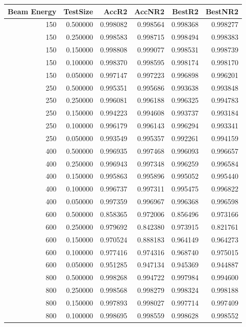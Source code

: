 \documentclass{article}
\begin{document}
	
\begin{tabular}{|r|r|r|r|r|r|}
\toprule
Beam Energy & TestSize & AccR2 & AccNR2 & BestR2 & BestNR2 \\
\midrule
150 & 0.500000 & 0.998082 & 0.998564 & 0.998368 & 0.998277 \\
150 & 0.250000 & 0.998583 & 0.998715 & 0.998494 & 0.998383 \\
150 & 0.150000 & 0.998808 & 0.999077 & 0.998531 & 0.998739 \\
150 & 0.100000 & 0.998370 & 0.998595 & 0.998174 & 0.998170 \\
150 & 0.050000 & 0.997147 & 0.997223 & 0.996898 & 0.996201 \\
250 & 0.500000 & 0.995351 & 0.995686 & 0.993638 & 0.993848 \\
250 & 0.250000 & 0.996081 & 0.996188 & 0.996325 & 0.994783 \\
250 & 0.150000 & 0.994223 & 0.994608 & 0.993737 & 0.993184 \\
250 & 0.100000 & 0.996179 & 0.996143 & 0.996294 & 0.993341 \\
250 & 0.050000 & 0.993549 & 0.995357 & 0.992261 & 0.994159 \\
400 & 0.500000 & 0.996935 & 0.997468 & 0.996093 & 0.996657 \\
400 & 0.250000 & 0.996943 & 0.997348 & 0.996259 & 0.996584 \\
400 & 0.150000 & 0.995863 & 0.995896 & 0.995052 & 0.995440 \\
400 & 0.100000 & 0.996737 & 0.997311 & 0.995475 & 0.996822 \\
400 & 0.050000 & 0.997359 & 0.996967 & 0.996368 & 0.996598 \\
600 & 0.500000 & 0.858365 & 0.972006 & 0.856496 & 0.973166 \\
600 & 0.250000 & 0.979692 & 0.842380 & 0.973915 & 0.821761 \\
600 & 0.150000 & 0.970524 & 0.888183 & 0.964149 & 0.964273 \\
600 & 0.100000 & 0.977416 & 0.974316 & 0.968740 & 0.975015 \\
600 & 0.050000 & 0.951285 & 0.947134 & 0.945369 & 0.944887 \\
800 & 0.500000 & 0.998268 & 0.994722 & 0.997984 & 0.994600 \\
800 & 0.250000 & 0.998568 & 0.998279 & 0.998324 & 0.998188 \\
800 & 0.150000 & 0.997893 & 0.998027 & 0.997714 & 0.997409 \\
800 & 0.100000 & 0.998695 & 0.998559 & 0.998628 & 0.998552 \\

\end{tabular}
\end{document}
